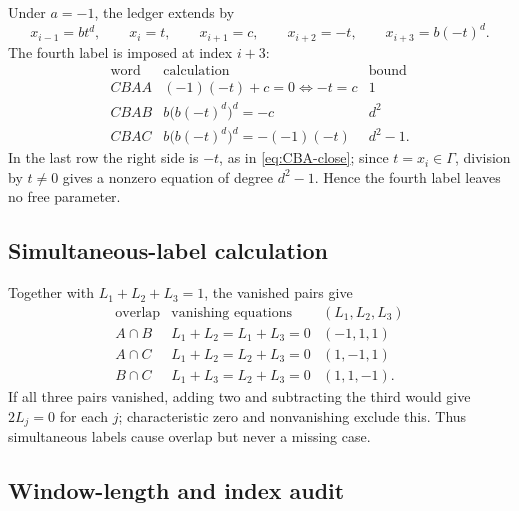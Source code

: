 \documentclass[11pt]{article}
\theoremstyle{definition}
\theoremstyle{remark}
\begin{document}
Under \(a=-1\), the ledger extends by
\[
 x_{i-1}=bt^d,\qquad x_i=t,\qquad x_{i+1}=c,\qquad
 x_{i+2}=-t,\qquad x_{i+3}=b(-t)^d.
\]
The fourth label is imposed at index \(i+3\):
\[
\begin{array}{c|l|c}
\text{word}&\text{calculation}&\text{bound}\\ \hline
CBAA&(-1)(-t)+c=0\Longleftrightarrow -t=c&1\\
CBAB&b\bigl(b(-t)^d\bigr)^d=-c&d^2\\
CBAC&b\bigl(b(-t)^d\bigr)^d=-(-1)(-t)&d^2-1.
\end{array}
\]
In the last row the right side is \(-t\), as in \eqref{eq:CBA-close}; since
\(t=x_i\in\Gamma\), division by \(t\ne0\) gives a nonzero equation of
degree \(d^2-1\).  Hence the fourth label leaves no free parameter.

\subsection*{Simultaneous-label calculation}

Together with \(L_1+L_2+L_3=1\), the vanished pairs give
\[
\begin{array}{c|c|c}
\text{overlap}&\text{vanishing equations}&(L_1,L_2,L_3)\\ \hline
A\cap B&L_1+L_2=L_1+L_3=0&(-1,1,1)\\
A\cap C&L_1+L_2=L_2+L_3=0&(1,-1,1)\\
B\cap C&L_1+L_3=L_2+L_3=0&(1,1,-1).
\end{array}
\]
If all three pairs vanished, adding two and subtracting the third would
give \(2L_j=0\) for each \(j\); characteristic zero and nonvanishing exclude
this.  Thus simultaneous labels cause overlap but never a missing case.

\subsection*{Window-length and index audit}
\end{document}
